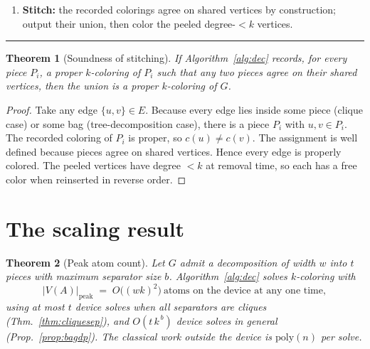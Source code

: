 \documentclass[11pt]{article}
\newtheorem{theorem}{Theorem}[section]
\theoremstyle{definition}
\theoremstyle{remark}
\begin{document}
\begin{algorithm}[h]
\begin{enumerate}[leftmargin=2.4em,itemsep=1pt,label=\arabic*.]
\begin{enumerate}[leftmargin=1.6em,label=(\alph*),itemsep=0pt]
              boundary table $\mathcal{T}$);
        \item build $G_i'(\beta)$ (Def.~\ref{def:precolorG}), gadgetize to a UDG
              MWIS instance, solve on the device, decode
              (Prop.~\ref{prop:precolorexact});
        \item if no size-$|P_i|$ set exists for any $\beta$, report ``not
              $k$-colorable''; else record the piece's coloring (clique case:
              realign by the permutation of Thm.~\ref{thm:cliquesep}).
      \end{enumerate}
\item \textbf{Stitch:} the recorded colorings agree on shared vertices by
      construction; output their union, then color the peeled degree-$<k$ vertices.
\end{enumerate}
\vspace{-4pt}\rule{\linewidth}{0.4pt}
\end{algorithm}

\begin{theorem}[Soundness of stitching]
\label{thm:stitch}
If Algorithm~\ref{alg:dec} records, for every piece $P_i$, a proper $k$-coloring of
$P_i$ such that any two pieces agree on their shared vertices, then the union is a
proper $k$-coloring of $G$.
\end{theorem}

\begin{proof}
Take any edge $\{u,v\}\in E$. Because every edge lies inside some piece (clique
case) or some bag (tree-decomposition case), there is a piece $P_i$ with
$u,v\in P_i$. The recorded coloring of $P_i$ is proper, so $c(u)\ne c(v)$. The
assignment is well defined because pieces agree on shared vertices. Hence every
edge is properly colored. The peeled vertices have degree $<k$ at removal time, so
each has a free color when reinserted in reverse order.
\end{proof}

\section{The scaling result}
\label{sec:scaling}

\begin{theorem}[Peak atom count]
\label{thm:peak}
Let $G$ admit a decomposition of width $w$ into $t$ pieces with maximum separator
size $b$. Algorithm~\ref{alg:dec} solves $k$-coloring with
\[
   |V(A)|_{\mathrm{peak}} \;=\; O\big((wk)^2\big)\ \text{atoms on the device at any one time},
\]
using at most $t$ device solves when all separators are cliques
(Thm.~\ref{thm:cliquesep}), and $O(t\,k^{\,b})$ device solves in general
(Prop.~\ref{prop:bagdp}). The classical work outside the device is
$\mathrm{poly}(n)$ per solve.
\end{theorem}
\end{document}
